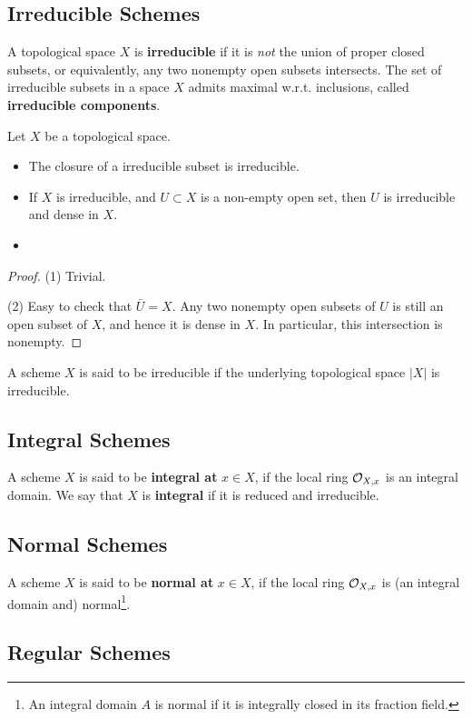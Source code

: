 \subsection{Irreducible Schemes}
A topological space $X$ is \textbf{irreducible}
if it is \textit{not} the union of proper closed subsets, or equivalently, any two nonempty open subsets intersects.
The set of irreducible subsets in a space $X$ admits maximal w.r.t.\! inclusions,
called \textbf{irreducible components}.
\begin{proposition}
    Let $X$ be a topological space.
\begin{itemize}
    \item [(1)] The closure of a irreducible subset is irreducible.
    \item [(2)] If $X$ is irreducible, and $U\subset X$ is a non-empty open set, then $U$ is irreducible and dense in $X$.
    \item [(3)]
\end{itemize}
\end{proposition}
\begin{proof}
    (1) Trivial.\par
    (2) Easy to check that $\bar U = X$.
    Any two nonempty open subsets of $U$ is still an open subset of $X$, and hence it is dense in $X$. In particular, this intersection is nonempty.\par
\end{proof}

A scheme $X$ is said to be irreducible if the underlying topological space $|X|$ is irreducible.


\subsection{Integral Schemes}
A scheme $X$ is said to be \textbf{integral at} $x\in X$, if the local ring $\mathcal{O}_{X, x}$ is an integral domain.
We say that $X$ is \textbf{integral} if it is reduced and irreducible.


\subsection{Normal Schemes}

A scheme $X$ is said to be \textbf{normal at}
$x\in X$, if the local ring $\mathcal{O}_{X, x}$ is (an integral domain and) normal\footnote{
    An integral domain $A$ is normal if it is integrally closed in its fraction field.
}.

\subsection{Regular Schemes}



